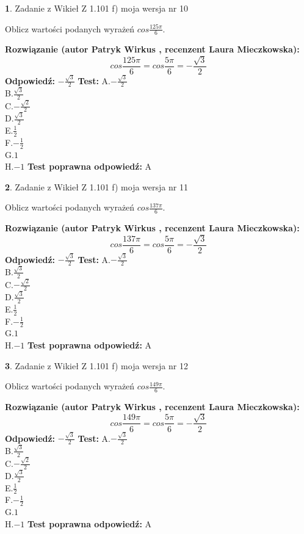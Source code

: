 \documentclass[12pt, a4paper]{article}
\theoremstyle{definition} %
\newtheorem{zad}{}
\newcommand{\zadStart}[1]{\begin{zad}#1\newline}
\newcommand{\zadStop}{\end{zad}}
\newcommand{\rozwStart}[2]{\noindent \textbf{Rozwiązanie (autor #1 , recenzent #2): }\newline}
\newcommand{\rozwStop}{\newline}
\newcommand{\odpStart}{\noindent \textbf{Odpowiedź:}\newline}
\newcommand{\odpStop}{\newline}
\newcommand{\testStart}{\noindent \textbf{Test:}\newline}
\newcommand{\testStop}{\newline}
\newcommand{\kluczStart}{\noindent \textbf{Test poprawna odpowiedź:}\newline}
\newcommand{\kluczStop}{\newline}
\begin{document}
\zadStart{Zadanie z Wikieł Z 1.101 f) moja wersja nr 10}

Oblicz wartości podanych wyrażeń $cos \frac{125\pi}{6}$.
\zadStop
\rozwStart{Patryk Wirkus}{Laura Mieczkowska}
$$cos \frac{125\pi}{6} = cos \frac{5\pi}{6} = -\frac{\sqrt{3}}{2}$$
\rozwStop
\odpStart
$-\frac{\sqrt{3}}{2}$
\odpStop
\testStart
A.$-\frac{\sqrt{3}}{2}$\\
B.$\frac{\sqrt{3}}{2}$\\
C.$-\frac{\sqrt{2}}{2}$\\
D.$\frac{\sqrt{3}}{2}$\\
E.$\frac{1}{2}$\\
F.$-\frac{1}{2}$\\
G.$1$\\
H.$-1$
\testStop
\kluczStart
A
\kluczStop



\zadStart{Zadanie z Wikieł Z 1.101 f) moja wersja nr 11}

Oblicz wartości podanych wyrażeń $cos \frac{137\pi}{6}$.
\zadStop
\rozwStart{Patryk Wirkus}{Laura Mieczkowska}
$$cos \frac{137\pi}{6} = cos \frac{5\pi}{6} = -\frac{\sqrt{3}}{2}$$
\rozwStop
\odpStart
$-\frac{\sqrt{3}}{2}$
\odpStop
\testStart
A.$-\frac{\sqrt{3}}{2}$\\
B.$\frac{\sqrt{3}}{2}$\\
C.$-\frac{\sqrt{2}}{2}$\\
D.$\frac{\sqrt{3}}{2}$\\
E.$\frac{1}{2}$\\
F.$-\frac{1}{2}$\\
G.$1$\\
H.$-1$
\testStop
\kluczStart
A
\kluczStop



\zadStart{Zadanie z Wikieł Z 1.101 f) moja wersja nr 12}

Oblicz wartości podanych wyrażeń $cos \frac{149\pi}{6}$.
\zadStop
\rozwStart{Patryk Wirkus}{Laura Mieczkowska}
$$cos \frac{149\pi}{6} = cos \frac{5\pi}{6} = -\frac{\sqrt{3}}{2}$$
\rozwStop
\odpStart
$-\frac{\sqrt{3}}{2}$
\odpStop
\testStart
A.$-\frac{\sqrt{3}}{2}$\\
B.$\frac{\sqrt{3}}{2}$\\
C.$-\frac{\sqrt{2}}{2}$\\
D.$\frac{\sqrt{3}}{2}$\\
E.$\frac{1}{2}$\\
F.$-\frac{1}{2}$\\
G.$1$\\
H.$-1$
\testStop
\kluczStart
A
\kluczStop
\end{document}
